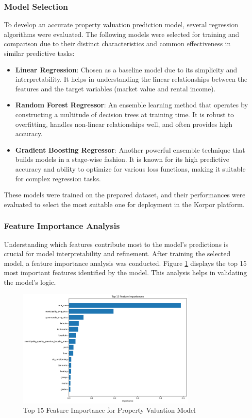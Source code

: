 \subsubsection{Model Selection}
To develop an accurate property valuation prediction model, several regression algorithms were evaluated. The following models were selected for training and comparison due to their distinct characteristics and common effectiveness in similar predictive tasks:
\begin{itemize}
    \item \textbf{Linear Regression}: Chosen as a baseline model due to its simplicity and interpretability. It helps in understanding the linear relationships between the features and the target variables (market value and rental income).
    \item \textbf{Random Forest Regressor}: An ensemble learning method that operates by constructing a multitude of decision trees at training time. It is robust to overfitting, handles non-linear relationships well, and often provides high accuracy.
    \item \textbf{Gradient Boosting Regressor}: Another powerful ensemble technique that builds models in a stage-wise fashion. It is known for its high predictive accuracy and ability to optimize for various loss functions, making it suitable for complex regression tasks.
\end{itemize}
These models were trained on the prepared dataset, and their performances were evaluated to select the most suitable one for deployment in the Korpor platform.

\subsubsection{Feature Importance Analysis}
Understanding which features contribute most to the model's predictions is crucial for model interpretability and refinement. After training the selected model, a feature importance analysis was conducted. Figure \ref{fig:feature-importance} displays the top 15 most important features identified by the model. This analysis helps in validating the model's logic.

\begin{figure}[htbp]
    \centering
    \includegraphics[width=0.8\textwidth]{images/top_15_feature_importance.png} %
    \caption{Top 15 Feature Importance for Property Valuation Model}
    \label{fig:feature-importance}
\end{figure}

